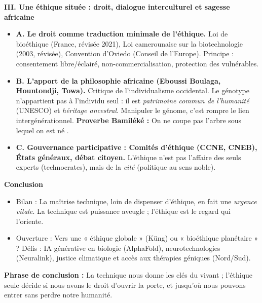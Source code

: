 \documentclass[11pt]{article}
\begin{document}
\begin{exoresolu}
    \textbf{III. Une éthique située : droit, dialogue interculturel et sagesse africaine}
    \begin{itemize}
        \item \textbf{A. Le droit comme traduction minimale de l'éthique.} Loi de bioéthique (France, révisée 2021), Loi camerounaise sur la biotechnologie (2003, révisée), Convention d'Oviedo (Conseil de l'Europe). Principe : consentement libre/éclairé, non-commercialisation, protection des vulnérables.
        \item \textbf{B. L'apport de la philosophie africaine (Eboussi Boulaga, Hountondji, Towa).} Critique de l'individualisme occidental. Le génotype n'appartient pas à l'individu seul : il est \emph{patrimoine commun de l'humanité} (UNESCO) et \emph{héritage ancestral}. Manipuler le génome, c'est rompre le lien intergénérationnel. \textbf{Proverbe Bamiléké :} \guillemotleft On ne coupe pas l'arbre sous lequel on est né \guillemotright.
        \item \textbf{C. Gouvernance participative : Comités d'éthique (CCNE, CNEB), États généraux, débat citoyen.} L'éthique n'est pas l'affaire des seuls experts (technocrates), mais de la \emph{cité} (politique au sens noble).
    \end{itemize}

    \textbf{Conclusion}
    \begin{itemize}
        \item Bilan : La maîtrise technique, loin de dispenser d'éthique, en fait une \emph{urgence vitale}. La technique est puissance aveugle ; l'éthique est le regard qui l'oriente.
        \item Ouverture : Vers une « éthique globale » (Küng) ou « bioéthique planétaire » ? Défis : IA générative en biologie (AlphaFold), neurotechnologies (Neuralink), justice climatique et accès aux thérapies géniques (Nord/Sud).
    \end{itemize}
    \textbf{Phrase de conclusion :} \guillemotleft La technique nous donne les clés du vivant ; l'éthique seule décide si nous avons le droit d'ouvrir la porte, et jusqu'où nous pouvons entrer sans perdre notre humanité. \guillemotright
\end{exoresolu}
\end{document}
